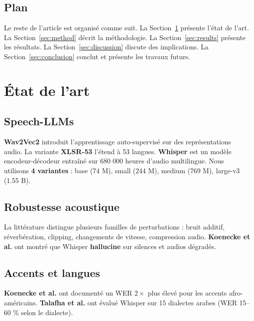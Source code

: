 \documentclass[11pt,a4paper]{article}
\begin{document}
\subsection{Plan}

Le reste de l'article est organisé comme suit. La Section~\ref{sec:related}
présente l'état de l'art. La Section~\ref{sec:method} décrit la méthodologie.
La Section~\ref{sec:results} présente les résultats. La
Section~\ref{sec:discussion} discute des implications. La
Section~\ref{sec:conclusion} conclut et présente les travaux futurs.

\section{État de l'art}
\label{sec:related}

\subsection{Speech-LLMs}

\textbf{Wav2Vec2} \cite{baevski2020wav2vec} introduit l'apprentissage
auto-supervisé sur des représentations audio. La variante \textbf{XLSR-53}
\cite{conneau2021xlsr} l'étend à 53 langues. \textbf{Whisper}
\cite{radford2022whisper} est un modèle encodeur-décodeur entraîné sur
680 000 heures d'audio multilingue. Nous utilisons \textbf{4 variantes} :
base (74 M), small (244 M), medium (769 M), large-v3 (1.55 B).

\subsection{Robustesse acoustique}

La littérature distingue plusieurs familles de perturbations : bruit additif,
réverbération, clipping, changements de vitesse, compression audio.
\textbf{Koenecke et al.} \cite{koenecke2024careless} ont montré que Whisper
\textbf{hallucine} sur silences et audios dégradés.

\subsection{Accents et langues}

\textbf{Koenecke et al.} \cite{koenecke2020racial} ont documenté un WER
$2\times$ plus élevé pour les accents afro-américains. \textbf{Talafha et al.}
\cite{talafha2023whisper, talafha2026zeroshot} ont évalué Whisper sur 15
dialectes arabes (WER 15--60 \% selon le dialecte).
\end{document}
